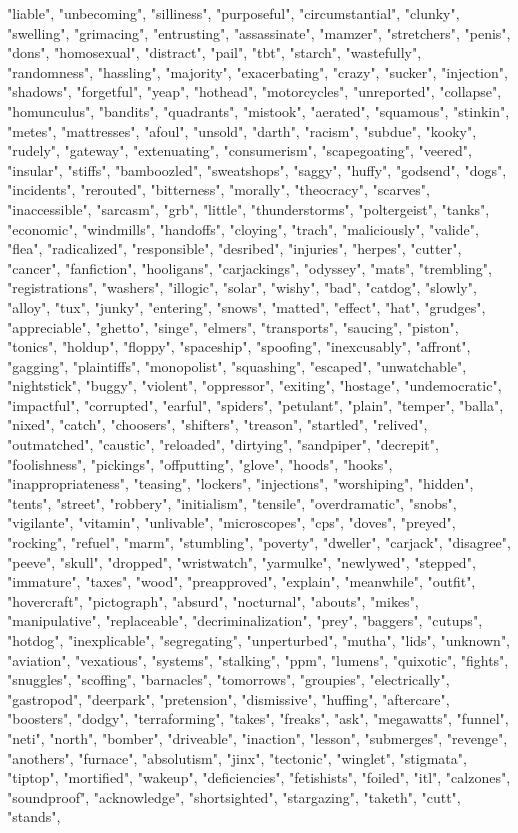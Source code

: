 "liable", "unbecoming", "silliness", "purposeful", "circumstantial", "clunky", "swelling", "grimacing", "entrusting", "assassinate", "mamzer", "stretchers", "penis", "dons", "homosexual", "distract", "pail", "tbt", "starch", "wastefully", "randomness", "hassling", "majority", "exacerbating", "crazy", "sucker", "injection", "shadows", "forgetful", "yeap", "hothead", "motorcycles", "unreported", "collapse", "homunculus", "bandits", "quadrants", "mistook", "aerated", "squamous", "stinkin", "metes", "mattresses", "afoul", "unsold", "darth", "racism", "subdue", "kooky", "rudely", "gateway", "extenuating", "consumerism", "scapegoating", "veered", "insular", "stiffs", "bamboozled", "sweatshops", "saggy", "huffy", "godsend", "dogs", "incidents", "rerouted", "bitterness", "morally", "theocracy", "scarves", "inaccessible", "sarcasm", "grb", "little", "thunderstorms", "poltergeist", "tanks", "economic", "windmills", "handoffs", "cloying", "trach", "maliciously", "valide", "flea", "radicalized", "responsible", "desribed", "injuries", "herpes", "cutter", "cancer", "fanfiction", "hooligans", "carjackings", "odyssey", "mats", "trembling", "registrations", "washers", "illogic", "solar", "wishy", "bad", "catdog", "slowly", "alloy", "tux", "junky", "entering", "snows", "matted", "effect", "hat", "grudges", "appreciable", "ghetto", "singe", "elmers", "transports", "saucing", "piston", "tonics", "holdup", "floppy", "spaceship", "spoofing", "inexcusably", "affront", "gagging", "plaintiffs", "monopolist", "squashing", "escaped", "unwatchable", "nightstick", "buggy", "violent", "oppressor", "exiting", "hostage", "undemocratic", "impactful", "corrupted", "earful", "spiders", "petulant", "plain", "temper", "balla", "nixed", "catch", "choosers", "shifters", "treason", "startled", "relived", "outmatched", "caustic", "reloaded", "dirtying", "sandpiper", "decrepit", "foolishness", "pickings", "offputting", "glove", "hoods", "hooks", "inappropriateness", "teasing", "lockers", "injections", "worshiping", "hidden", "tents", "street", "robbery", "initialism", "tensile", "overdramatic", "snobs", "vigilante", "vitamin", "unlivable", "microscopes", "cps", "doves", "preyed", "rocking", "refuel", "marm", "stumbling", "poverty", "dweller", "carjack", "disagree", "peeve", "skull", "dropped", "wristwatch", "yarmulke", "newlywed", "stepped", "immature", "taxes", "wood", "preapproved", "explain", "meanwhile", "outfit", "hovercraft", "pictograph", "absurd", "nocturnal", "abouts", "mikes", "manipulative", "replaceable", "decriminalization", "prey", "baggers", "cutups", "hotdog", "inexplicable", "segregating", "unperturbed", "mutha", "lids", "unknown", "aviation", "vexatious", "systems", "stalking", "ppm", "lumens", "quixotic", "fights", "snuggles", "scoffing", "barnacles", "tomorrows", "groupies", "electrically", "gastropod", "deerpark", "pretension", "dismissive", "huffing", "aftercare", "boosters", "dodgy", "terraforming", "takes", "freaks", "ask", "megawatts", "funnel", "neti", "north", "bomber", "driveable", "inaction", "lesson", "submerges", "revenge", "anothers", "furnace", "absolutism", "jinx", "tectonic", "winglet", "stigmata", "tiptop", "mortified", "wakeup", "deficiencies", "fetishists", "foiled", "itl", "calzones", "soundproof", "acknowledge", "shortsighted", "stargazing", "taketh", "cutt", "stands", 